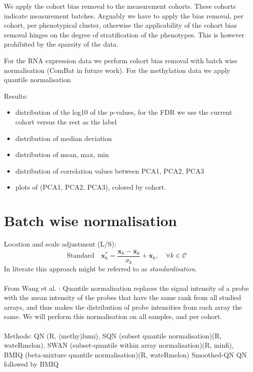 \documentclass[a4paper,10pt]{article}
\begin{document}
We apply the cohort bias removal to the measurement cohorts. These cohorts indicate measurement batches.
%
Arguably we have to apply the bias removal, per cohort, per phenotypical cluster, otherwise
the applicability of the cohort bias removal hinges on the degree of stratification of the phenotypes.
This is however prohibited by the sparsity of the data.

For the RNA expression data we perform cohort bias removal with batch wise normalisation (ComBat in future work). For the methylation data we apply quantile normalisation 

Results:
\begin{itemize}
\item distribution of the log10 of the p-values, for the FDR we use the current cohort versus the rest as the label
\item distribution of median deviation
\item distribution of mean, max, min 
\item distribution of correlation values between PCA1, PCA2, PCA3
\item plots of (PCA1, PCA2, PCA3), colored by cohort.
\end{itemize}
%

\section{Batch wise normalisation}
%
Location and scale adjustment (L/S):
\begin{equation}
\mbox{Standard}\quad \mathbf{x}^*_k= \frac{\mathbf{x}_k-\overline{\mathbf{x}}_k}{\sigma_k} + \overline{\mathbf{x}}_k,\quad \forall k\in \mathcal{C}
\end{equation}
%
In literate this approach might be referred to as \textit{standardisation}. \\ \\
%
From Wang et al. \cite{Wang2015}: Quantile normalisation replaces the signal intensity of a probe with the mean intensity of the probes that have the same rank from all studied arrays, and thus makes the distribution of probe intensities from each array the same. We will perform this normalisation 
on all samples, and per cohort. \\ \\ 
%
Methods: 
QN  (R, (methy)lumi), 
SQN (subset quantile normalisation)(R, wateRmelon), 
SWAN (subset-quantile within array normalisation)(R, minfi),
BMIQ (beta-mixture quantile normalisation)(R, wateRmelon)
Smoothed-QN
QN followed by BMIQ
\end{document}

